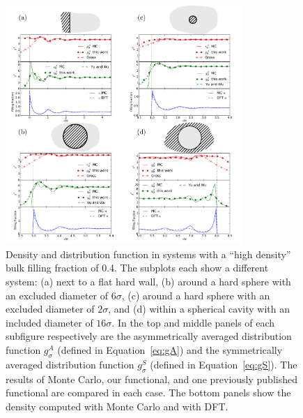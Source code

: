 \begin{figure}
  \begin{center}
    \noindent\includegraphics[width=0.8\textwidth]{figs/high-density}
  \end{center}
  \caption{Density and distribution function in systems
    with a ``high density'' bulk filling fraction of 0.4.  The
    subplots each show a different system: (a) next to a flat hard wall, (b)
    around a hard sphere with an excluded diameter of $6\sigma$, (c)
    around a hard sphere with an excluded diameter of $2\sigma$, and
    (d) within a spherical cavity with an included diameter of $16\sigma$.
    In the top and middle panels of each subfigure respectively are the
    asymmetrically averaged distribution function $g_\sigma^A$ (defined
    in Equation~\ref{eq:gA}) and the symmetrically averaged
    distribution function $g_\sigma^S$ (defined in
    Equation~\ref{eq:gS}).  The results of Monte Carlo, our
    functional, and one previously published
    functional\cite{gross2009density,
      yu2002fmt-dft-inhomogeneous-associating} are compared in each
    case.  The bottom panels show the density computed with
    Monte Carlo and with DFT.}
  \label{fig:high-density}
\end{figure}

